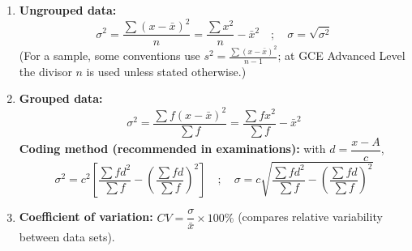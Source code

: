 \documentclass[11pt]{article}
\begin{document}
\begin{methode}
\begin{enumerate}
    \item \textbf{Ungrouped data:}
    \[ \sigma^2 = \frac{\sum (x - \bar{x})^2}{n} = \frac{\sum x^2}{n} - \bar{x}^2 \quad ; \quad \sigma = \sqrt{\sigma^2} \]
    (For a sample, some conventions use $s^2 = \frac{\sum (x-\bar{x})^2}{n-1}$; at GCE Advanced Level the divisor $n$ is used unless stated otherwise.)
    \item \textbf{Grouped data:}
    \[ \sigma^2 = \frac{\sum f(x - \bar{x})^2}{\sum f} = \frac{\sum fx^2}{\sum f} - \bar{x}^2 \]
    \textbf{Coding method (recommended in examinations):} with $d = \dfrac{x-A}{c}$,
    \[ \sigma^2 = c^2 \left[ \frac{\sum fd^2}{\sum f} - \left( \frac{\sum fd}{\sum f} \right)^2 \right] \quad ; \quad \sigma = c \sqrt{ \frac{\sum fd^2}{\sum f} - \left( \frac{\sum fd}{\sum f} \right)^2 } \]
    \item \textbf{Coefficient of variation:} $CV = \dfrac{\sigma}{\bar{x}} \times 100\%$ (compares relative variability between data sets).
\end{enumerate}
\end{methode}
\end{document}
